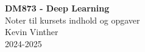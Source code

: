 \begin{center}
	\noindent
	{\huge \bfseries \sffamily \color{TurquoiseGreen} DM873 - Deep Learning}\\
	\vspace{0.2cm}
	{\large \sffamily Noter til kursets indhold og opgaver}\\
	\vspace{6.0cm}
	{\large \sffamily \color{gray} Kevin Vinther}\\
	{\large \sffamily \color{gray} 2024-2025}
\end{center}

\thispagestyle{empty}
